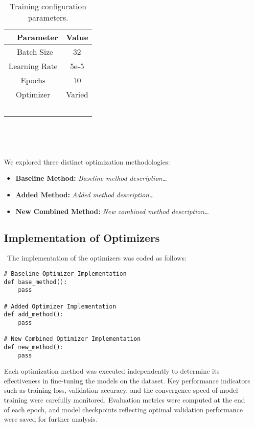\documentclass{article} %
\begin{document}
\begin{table}[h]\
  \centering\
  \begin{tabular}{|c|c|}\
    \hline\
    \textbf{Parameter} & \textbf{Value} \\
    \hline\
    Batch Size & 32 \\
    Learning Rate & 5e-5 \\
    Epochs & 10 \\
    Optimizer & Varied \\
    \hline\
  \end{tabular}\
  \caption{Training configuration parameters.}\
  \label{tab:training_config}\
\end{table}

\noindent We explored three distinct optimization methodologies:
\begin{itemize}
    \item \textbf{Baseline Method:} \textit{Baseline method description\ldots} 
    \item \textbf{Added Method:} \textit{Added method description\ldots} 
    \item \textbf{New Combined Method:} \textit{New combined method description\ldots} 
\end{itemize}

\subsection{Implementation of Optimizers}\
\noindent The implementation of the optimizers was coded as follows:
\begin{verbatim}
# Baseline Optimizer Implementation
def base_method():
    pass

# Added Optimizer Implementation
def add_method():
    pass

# New Combined Optimizer Implementation
def new_method():
    pass
\end{verbatim}
\noindent Each optimization method was executed independently to determine its effectiveness in fine-tuning the models on the dataset. Key performance indicators such as training loss, validation accuracy, and the convergence speed of model training were carefully monitored. Evaluation metrics were computed at the end of each epoch, and model checkpoints reflecting optimal validation performance were saved for further analysis.
\end{document}
